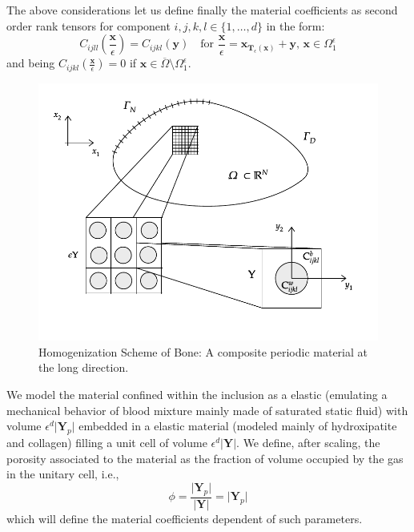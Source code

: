 The above considerations let us define finally the material coefficients as second order rank tensors for component $i,j,k,l \in \{1,\dots, d\}$ in the form:
\begin{equation*}
    C_{ijll}(\frac{\mathbf{x}}{\epsilon}) = C_{ijkl}(\mathbf{y}) \quad \text{for } \frac{\mathbf{x}}{\epsilon} = \mathbf{x}_{\mathbf{T}_{\epsilon}(\mathbf{x})} + \mathbf{y}, \, \mathbf{x} \in \Omega_1^{\epsilon}
\end{equation*}
and being $C_{ijkl}(\frac{\mathbf{x}}{\epsilon}) = 0$ if $\mathbf{x} \in \overline{\Omega} \setminus \Omega_1^{\epsilon}$.

\begin{figure}[!h]
	\centering
	\includegraphics[scale=.8]{images/HomSchemes/HomBasicScheme.pdf}
	\caption{Homogenization Scheme of Bone: A composite periodic material at the long direction.}
	\label{HomBasicScheme}
\end{figure}

\begin{rem}
We model the material confined within the inclusion as a elastic (emulating a mechanical behavior of blood mixture mainly made of saturated static fluid) with volume $\epsilon^d \vert \mathbf{Y}_p \vert$ embedded in a elastic material (modeled mainly of hydroxipatite and collagen) filling a unit cell of volume $\epsilon^d \vert \mathbf{Y} \vert$.
We define, after scaling, the porosity associated to the material as the fraction of volume occupied by the gas in the unitary cell, i.e., 
\begin{equation*}
\phi = \frac{\vert \mathbf{Y}_p \vert}{\vert \mathbf{Y} \vert} = \vert \mathbf{Y}_p \vert
\end{equation*}
which will define the material coefficients dependent of such parameters.
\end{rem}


